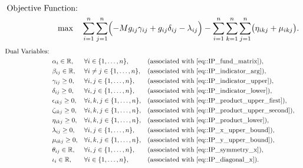 
\begin{alignat}{3}
\text{Objective Function: } & \nonumber \\
\max \quad & \sum_{i=1}^n \sum_{j=1}^n \Bigl( - M g_{ij}\gamma_{ij} + g_{ij}\delta_{ij} - \lambda_{ij} \Bigr) - \sum_{i=1}^n \sum_{k=1}^n \sum_{j=1}^n \bigl(\eta_{ikj} + \mu_{ikj} \bigr). \label{eq::dual_objective_function}
\end{alignat}
\begin{alignat}{3}
\text{Dual Variables: } & \nonumber \\
& \alpha_{i} \in \mathbb{R}, && \forall i\in \{1,\dots,n\}, && \text{(associated with \eqref{eq::IP_fund_matrix})}, \label{eq::dual_alpha} \\
& \beta_{ij} \in \mathbb{R}, && \forall i \neq j \in \{1,\dots,n\}, && \text{(associated with \eqref{eq::IP_indicator_arg})}, \label{eq::dual_beta} \\
& \gamma_{ij} \ge 0,&& \forall i,j \in \{1,\dots,n\},&& \text{(associated with \eqref{eq::IP_indicator_upper})}, \label{eq::dual_gamma} \\
& \delta_{ij} \ge 0, && \forall i,j \in \{1,\dots,n\}, && \text{(associated with \eqref{eq::IP_indicator_lower})}, \label{eq::dual_delta} \\
& \epsilon_{ikj} \ge 0, && \forall i,k,j \in \{1,\dots,n\}, && \text{(associated with \eqref{eq::IP_product_upper_first})}, \label{eq::dual_epsilon} \\
& \zeta_{ikj} \ge 0, && \forall i,k,j \in \{1,\dots,n\}, && \text{(associated with \eqref{eq::IP_product_upper_second})}, \label{eq::dual_zeta} \\
& \eta_{ikj} \geq 0, && \forall i,k,j \in \{1,\dots,n\}, && \text{(associated with \eqref{eq::IP_product_lower})}, \label{eq::dual_eta} \\
& \lambda_{ij} \geq 0, && \forall i,j \in \{1,\dots,n\}, && \text{(associated with \eqref{eq::IP_x_upper_bound})}, \label{eq::dual_lambda}  \\
& \mu_{ikj} \geq 0,  && \forall i,k,j \in \{1,\dots,n\}, && \text{(associated with \eqref{eq::IP_y_upper_bound})}, \label{eq::dual_mu} \\ 
& \theta_{ij} \in \mathbb{R}, && \forall i,j \in \{1,\dots,n\}, && \text{(associated with \eqref{eq::IP_symmetry_x})}, \label{eq::dual_theta} \\
& \iota_{i} \in \mathbb{R}, && \forall i \in \{1,\dots,n\}, && \text{(associated with \eqref{eq::IP_diagonal_x})}. \label{eq::dual_iota} 
\end{alignat}
